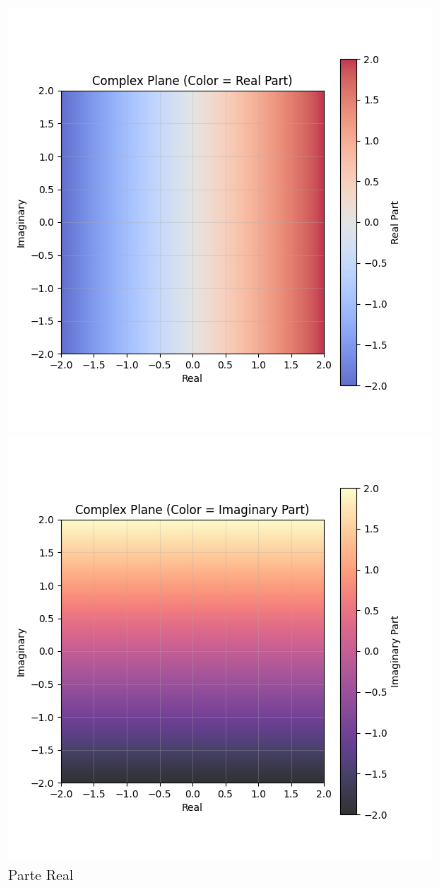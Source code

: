 \begin{figure}[H]
    \centering
    \begin{minipage}{0.48\textwidth}
        \centering
        \includegraphics[width=\textwidth]{Imagens//complexPlane/complex_plane_real_part.png}
        \caption*{Parte Real}
    \end{minipage}\hfill
    \begin{minipage}{0.48\textwidth}
        \centering
        \includegraphics[width=\textwidth]{Imagens//complexPlane/complex_plane_imaginary_part.png}

\end{minipage}
\end{figure}
